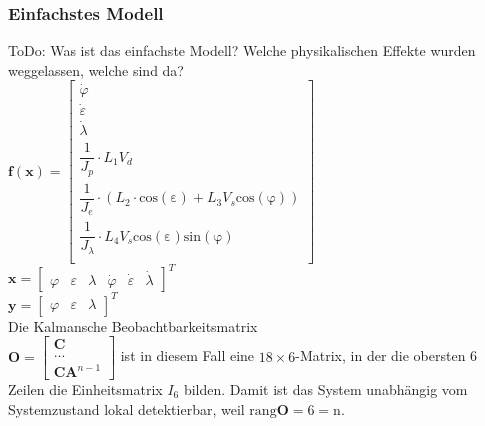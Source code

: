 \documentclass[times, 10pt,twocolumn]{article}
\begin{document}
	\subsubsection{Einfachstes Modell}
	ToDo: Was ist das einfachste Modell? Welche physikalischen Effekte wurden weggelassen, welche sind da? \\
	$\bm f(\bm x) = \begin{bmatrix}
	\dot \varphi \\
	\dot \varepsilon \\
	\dot \lambda  \\
	\dfrac{1}{J_p} \cdot L_1 V_d \\
	\dfrac{1}{J_e} \cdot (L_2 \cdot \mathrm{cos(\varepsilon)} + L_3 V_s \mathrm{cos(\varphi)}) \\
	\dfrac{1}{J_{\lambda}} \cdot L_4 V_s \mathrm{cos(\varepsilon)} \mathrm{sin(\varphi)} \\
	\end{bmatrix} $ \\
	$\bm x = \begin{bmatrix}
	\varphi & \varepsilon & \lambda & \dot \varphi & \dot \varepsilon & \dot \lambda 
	\end{bmatrix}^T $ \\
	$\bm y = \begin{bmatrix}
	\varphi & \varepsilon & \lambda 
	\end{bmatrix}^T $ \\
	Die Kalmansche Beobachtbarkeitsmatrix \\ $\bm O = \begin{bmatrix}
	\bm C \\
	... \\
	\bm C \bm A^{n-1}
	\end{bmatrix}$ ist in diesem Fall eine $18\times 6$-Matrix, in der die obersten 6 Zeilen die Einheitsmatrix $I_6$ bilden. Damit ist das System unabhängig vom Systemzustand lokal detektierbar, weil $\mathrm{rang} \bm O = 6 = \mathrm{n}$.
\end{document}
